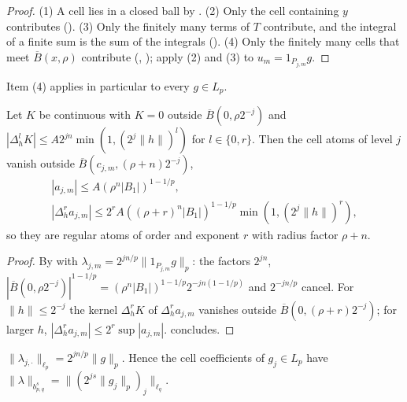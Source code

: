 \begin{proof}
\leanok
(1) A cell lies in a closed ball by . (2) Only the cell containing $y$
contributes (). (3) Only the finitely many terms of $T$ contribute, and
the integral of a finite sum is the sum of the integrals (). (4) Only the
finitely many cells that meet $\overline{B}(x, \rho)$ contribute (,
); apply (2) and (3) to $u_m = 1_{P_{j,m}} g$.
\end{proof}

Item (4) applies in particular to every $g \in L_p$.

\begin{lemma}
\label{lem:cell-atoms-regular}
\leanok
{}
Let $K$ be continuous with $K = 0$ outside $\overline{B}(0, \rho 2^{-j})$ and
$|\Delta_h^l K| \leq A 2^{jn} \min(1, (2^j \|h\|)^l)$ for $l \in \{0, r\}$. Then the cell atoms of
level $j$ vanish outside $\overline{B}(c_{j,m}, (\rho + n) 2^{-j})$,
\begin{gather*}
  |a_{j,m}| \leq A (\rho^n |B_1|)^{1 - 1/p}, \\
  |\Delta_h^r a_{j,m}| \leq 2^r A ((\rho + r)^n |B_1|)^{1 - 1/p} \min(1, (2^j \|h\|)^r),
\end{gather*}
so they are regular atoms of order and exponent $r$ with radius factor $\rho + n$.
\end{lemma}

\begin{proof}
\leanok
By  with $\lambda_{j,m} = 2^{jn/p} \|1_{P_{j,m}} g\|_p$: the factors
$2^{jn}$, $|\overline{B}(0, \rho 2^{-j})|^{1-1/p} = (\rho^n |B_1|)^{1-1/p} 2^{-jn(1-1/p)}$ and
$2^{-jn/p}$ cancel. For $\|h\| \leq 2^{-j}$ the kernel $\Delta_h^r K$ of $\Delta_h^r a_{j,m}$
vanishes outside $\overline{B}(0, (\rho + r) 2^{-j})$; for larger $h$,
$|\Delta_h^r a_{j,m}| \leq 2^r \sup |a_{j,m}|$.  concludes.
\end{proof}

\begin{lemma}
\label{lem:cell-coefficients}
\leanok
{}
$\|\lambda_{j,\cdot}\|_{\ell_p} = 2^{jn/p} \|g\|_p$. Hence the cell coefficients of $g_j \in L_p$
have $\|\lambda\|_{b^s_{p,q}} = \|(2^{js} \|g_j\|_p)_j\|_{\ell_q}$.
\end{lemma}

